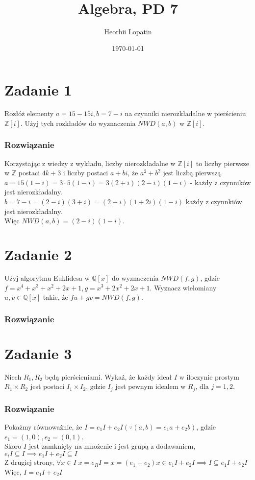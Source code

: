 \documentclass{article}
\title{Algebra, PD 7 }
\author{Heorhii Lopatin}
\date{\today}
\begin{document}
\maketitle %
\section*{Zadanie 1}
{
  Rozłóż elementy $a=15-15i, b=7-i$ na czynniki nierozkładalne w pierścieniu $\mathbb{Z}[i]$. Użyj tych rozkładów do wyznaczenia $NWD(a,b)$ w $\mathbb{Z}[i]$.
\subsubsection*{Rozwiązanie}
{
  Korzystając z wiedzy z wykładu, liczby nierozkładalne w $\mathbb{Z}[i]$ to liczby pierwsze w $\mathbb{Z}$ postaci $4k+3$ i liczby postaci $a+bi$, że $a^2+b^2$ jest liczbą pierwszą.\\
  $a=15(1-i)=3\cdot5(1-i)=3(2+i)(2-i)(1-i)$ - każdy z czynników jest nierozkładalny.\\
  $b=7-i=(2-i)(3+i)=(2-i)(1+2i)(1-i)$ każdy z czynnkiów jest nierozkładalny.\\ 
  Więc $NWD(a,b)=(2-i)(1-i)$.
}

\section*{Zadanie 2}
{
  Użyj algorytmu Euklidesa w $\mathbb{Q}[x]$ do wyznaczenia $NWD(f,g)$, gdzie $f = x^4 + x^3+x^2+2x+1,g=x^3+2x^2+2x+1$. Wyznacz wielomiany $u,v\in\mathbb{Q}[x]$ takie, że $fu+gv= NWD(f,g)$.
}
\subsubsection*{Rozwiązanie}
{


}
\section*{Zadanie 3}
{
  
Niech $R_1,R_2$ będą pierścieniami. Wykaż, że każdy ideał $I$ w iloczynie prostym $R_1\times R_2$ jest postaci $I_1\times I_2$, gdzie $I_j$ jest pewnym idealem w $R_j$, dla $j=1,2$.
}

\subsubsection*{Rozwiązanie}
{
Pokażmy równoważnie, że $I=e_1I+e_2I(\because (a,b) = e_1a+e_2b)$, gdzie $e_1=(1,0), e_2=(0,1)$.\\
Skoro $I$ jest zamknięty na mnożenie i jest grupą z dodawaniem, $e_iI\subseteq I \implies e_1I+e_2I \subseteq I$\\
Z drugiej strony, $\forall x \in I \; x = e_RI=x=(e_1+e_2)x\in e_1I+e_2I \implies I \subseteq e_1I+e_2I$\\ 
Więc, $I=e_1I+e_2I$\\


}

 

}
\end{document}
